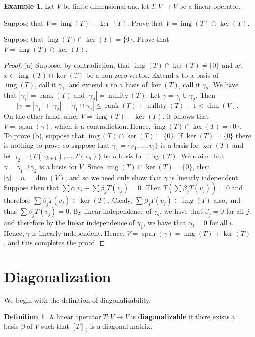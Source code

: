 \documentclass[12pt]{article}
\DeclareMathOperator{\rank}{rank}
\DeclareMathOperator{\spn}{span}
\DeclareMathOperator{\rng}{img}
\DeclareMathOperator{\nullity}{nullity}
\newcommand{\tv}{T:V\rightarrow V}
\theoremstyle{definition}
\newtheorem{definition}{Definition}[section]
\newtheorem{example}{Example}[section]
\begin{document}
\begin{example}\label{exm:img-ker}
Let $V$ be finite dimensional and let $T:V\rightarrow V$ be a linear operator.  
\begin{compactenum}[(a)]
\item Suppose that $V=\rng(T) + \ker(T)$.  Prove that $V=\rng(T)\oplus \ker(T)$.\\
\item Suppose that $\rng(T)\cap \ker(T)=\{0\}$.  Prove that $V=\rng(T)\oplus \ker(T)$.
\end{compactenum}
\end{example}
\begin{proof}
(a) Suppose, by contradiction, that $\rng(T)\cap \ker(T)\neq\{0\}$ and let $x\in\rng(T)\cap\ker(T)$ be a non-zero vector.  Extend $x$ to a basis of $\rng(T)$, call it $\gamma_1$, and extend $x$ to a basis of $\ker(T)$, call it $\gamma_2$.  We have that $|\gamma_1| = \rank(T)$ and $|\gamma_2| = \nullity(T)$.  Let $\gamma = \gamma_1\cup\gamma_2$.  Then 
\[
|\gamma| = |\gamma_1|+|\gamma_2| - |\gamma_1\cap\gamma_2| \leq \rank(T) + \nullity(T) - 1 < \dim(V).  
\]
On the other hand, since $V=\rng(T)+\ker(T)$, it follows that $V=\spn(\gamma)$, which is a contradiction.  Hence, $\rng(T)\cap\ker(T)=\{0\}$.  To prove (b), suppose that $\rng(T)\cap\ker(T)=\{0\}$.  If $\ker(T)=\{0\}$ there is nothing to prove so suppose that $\gamma_1=\{v_1,\ldots,v_k\}$ is a basis for $\ker(T)$ and let $\gamma_2=\{T(v_{k+1}),\ldots,T(v_{n})\}$ be a basis for $\rng(T)$.  We claim that $\gamma=\gamma_1\cup \gamma_2$ is a basis for $V$.  Since $\rng(T)\cap\ker(T)=\{0\}$, then $|\gamma|=n=\dim(V)$, and so we need only show that $\gamma$ is linearly independent.  Suppose then that $\sum \alpha_i v_i + \sum \beta_j T(v_j) = 0$.  Then $T(\sum \beta_j T(v_j)) = 0$ and therefore $\sum \beta_j T(v_j) \in \ker(T)$.  Clealy, $\sum\beta_j T(v_j) \in \rng(T)$ also, and thus $\sum \beta_j T(v_j) = 0$.  By linear independence of $\gamma_2$, we have that $\beta_j=0$ for all $j$, and therefore by the linear independence of $\gamma_1$, we have that $\alpha_i=0$ for all $i$.  Hence, $\gamma$ is linearly independent.  Hence, $V=\spn(\gamma)=\rng(T) + \ker(T)$, and this completes the proof.
\end{proof}

\section{Diagonalization}
We begin with the definition of diagonalizability.
\begin{definition}
A linear operator $\tv$ is \textbf{diagonalizable} if there exists a basis $\beta$ of $V$ such that $[T]_\beta$ is a diagonal matrix.
\end{definition}
\end{document}
